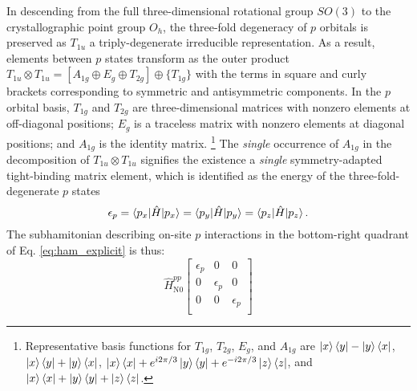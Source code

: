 \documentclass[twocolumn,showpacs,preprintnumbers,superscriptaddress,prb,floatfix,aps,10pt]{revtex4-1}
\newcommand*{\ham}{\hat{H}}
\begin{document}
In descending from the full three-dimensional rotational group $SO(3)$ to the crystallographic point group $O_h$, the three-fold degeneracy of $p$ orbitals is preserved as $T_{1u}$ a triply-degenerate irreducible representation. As a result, elements between $p$ states transform as the outer product $T_{1u} \otimes T_{1u} = [A_{1g} \oplus E_g \oplus T_{2g}] \oplus \{T_{1g}\}$ with the terms in square and curly brackets corresponding to symmetric and antisymmetric components. In the $p$ orbital basis, $T_{1g}$ and $T_{2g}$ are three-dimensional matrices with nonzero elements at off-diagonal positions; $E_g$ is a traceless matrix with nonzero elements at diagonal positions; and $A_{1g}$ is the identity matrix. \footnote{Representative basis functions for $T_{1g}$, $T_{2g}$, $E_g$, and $A_{1g}$ are $\ket{x}\bra{y} - \ket{y}\bra{x}$, $\ket{x}\bra{y} + \ket{y}\bra{x}$, $\ket{x}\bra{x} + e^{i2\pi/3}\ket{y}\bra{y} + e^{-i2\pi/3}\ket{z}\bra{z}$, and $\ket{x}\bra{x} + \ket{y}\bra{y} + \ket{z}\bra{z}$.} The \emph{single} occurrence of $A_{1g}$ in the decomposition of $T_{1u} \otimes T_{1u}$ signifies the existence a \emph{single} symmetry-adapted tight-binding matrix element, which is identified as the energy of the three-fold-degenerate $p$ states
%
\begin{equation}
\epsilon_{p}
= \braket{p_x | \ham | p_x} 
= \braket{p_y | \ham | p_y} 
= \braket{p_z | \ham | p_z} .
\end{equation}
%
The subhamitonian describing on-site $p$ interactions in the bottom-right quadrant of Eq. \ref{eq:ham_explicit} is thus:
%
\begin{equation}
\label{eq:0pp}
\ham_{\textrm{N0}}^{pp}
\begin{bmatrix}
\epsilon_{p} & 0 & 0 \\
0 & \epsilon_{p} & 0 \\
0 & 0 & \epsilon_{p} \\
\end{bmatrix}
\end{equation}
%
\end{document}
